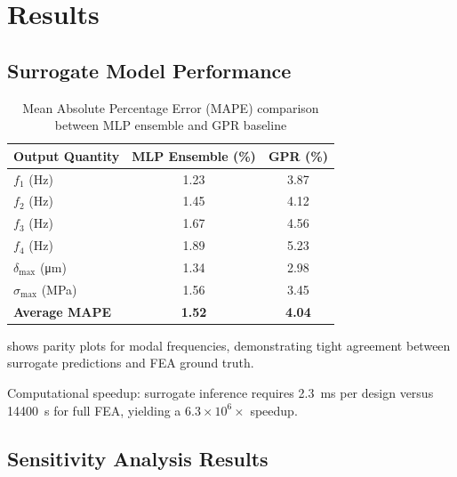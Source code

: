 \documentclass{elsarticle}
\begin{document}
\section{Results}
\label{sec:results}

\subsection{Surrogate Model Performance}


\begin{table}[htbp]
    \centering
    \caption{Mean Absolute Percentage Error (MAPE) comparison between MLP ensemble and GPR baseline}
    \label{tab:mape_results}
    \begin{tabular}{lcc}
        \toprule
        Output Quantity                       & MLP Ensemble (\%) & GPR (\%)      \\
        \midrule
        \(f_1\) (Hz)                          & 1.23              & 3.87          \\
        \(f_2\) (Hz)                          & 1.45              & 4.12          \\
        \(f_3\) (Hz)                          & 1.67              & 4.56          \\
        \(f_4\) (Hz)                          & 1.89              & 5.23          \\
        \(\delta_{\max}\) (\si{\micro\meter}) & 1.34              & 2.98          \\
        \(\sigma_{\max}\) (MPa)               & 1.56              & 3.45          \\
        \midrule
        \textbf{Average MAPE}                 & \textbf{1.52}     & \textbf{4.04} \\
        \bottomrule
    \end{tabular}
\end{table}

shows parity plots for modal frequencies, demonstrating tight agreement between surrogate predictions and FEA ground truth.



Computational speedup: surrogate inference requires \SI{2.3}{\milli\second} per design versus \SI{14400}{\second} for full FEA, yielding a \(6.3 \times 10^6\times\) speedup.

\subsection{Sensitivity Analysis Results}
\end{document}
